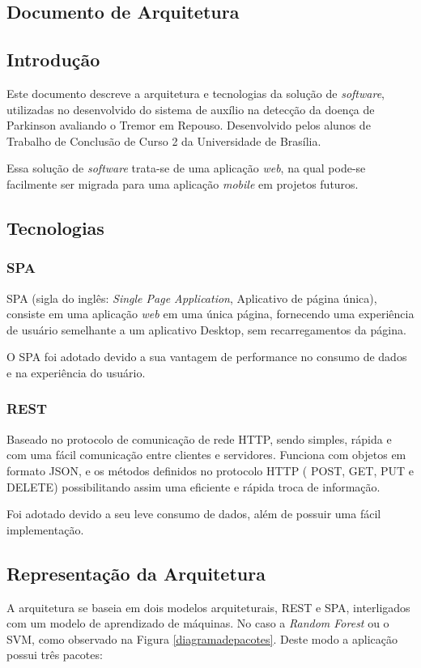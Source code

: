 \begin{apendicesenv}

    \partanexos
    \chapter{Documento de Arquitetura}
    \label{adoarquitetura}
    \section{Introdução}
    Este documento descreve a arquitetura e tecnologias da solução de \textit{software}, utilizadas no desenvolvido do sistema de auxílio na detecção da doença de Parkinson avaliando o Tremor em Repouso. Desenvolvido pelos alunos de Trabalho de Conclusão de Curso 2 da Universidade de Brasília.

    Essa solução de \textit{software} trata-se de uma aplicação \textit{web}, na qual pode-se facilmente ser migrada para uma aplicação \textit{mobile} em projetos futuros.

    \section{Tecnologias}
    \subsection{SPA}
    SPA (sigla do inglês: \textit{Single Page Application}, Aplicativo de página única), consiste em uma aplicação \textit{web} em uma única página, fornecendo uma experiência de usuário semelhante a um aplicativo Desktop, sem recarregamentos da página.

   O SPA foi adotado devido a sua vantagem de performance no consumo de dados e na experiência do usuário.

    \subsection{REST}
    Baseado no protocolo de comunicação de rede HTTP, sendo simples, rápida e com uma fácil comunicação entre clientes e servidores. Funciona com objetos em formato JSON, e os métodos definidos no protocolo HTTP ( POST, GET, PUT e DELETE) possibilitando assim uma eficiente e rápida troca de informação.

   Foi adotado devido a seu leve consumo de dados, além de possuir uma fácil implementação.

    \section{Representação da Arquitetura}
    A arquitetura se baseia em dois modelos arquiteturais, REST e SPA, interligados com um modelo de aprendizado de máquinas. No caso a \textit{Random Forest} ou o SVM, como observado na Figura \ref{diagramadepacotes}. Deste modo a aplicação possui três pacotes:


\end{apendicesenv}
